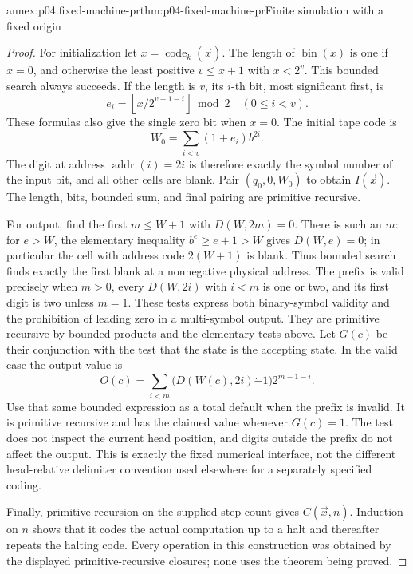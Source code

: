 \begin{annexitem}{annex:p04.fixed-machine-pr}{thm:p04-fixed-machine-pr}{Finite simulation with a fixed origin}
\begin{proof}
For initialization let \(x=\operatorname{code}_k(\vec x)\).
The length of \(\operatorname{bin}(x)\) is one if \(x=0\), and
otherwise the least positive \(v\leq x+1\) with \(x<2^v\).
This bounded search always succeeds. If the length is \(v\), its
\(i\)-th bit, most significant first, is
\[
 e_i=\left\lfloor x/2^{v-1-i}\right\rfloor\bmod2
       \quad(0\leq i<v).
\]
These formulas also give the single zero bit when \(x=0\).
The initial tape code is
\[
 W_0=\sum_{i<v}(1+e_i)b^{2i}.
\]
The digit at address \(\operatorname{addr}(i)=2i\) is therefore exactly
the symbol number of the input bit, and all other cells are blank.
Pair \((q_0,0,W_0)\) to obtain \(I(\vec x)\).
The length, bits, bounded sum, and final pairing are primitive recursive.

For output, find the first \(m\leq W+1\) with \(D(W,2m)=0\).
There is such an \(m\): for \(e>W\), the elementary inequality
\(b^e\geq e+1>W\) gives \(D(W,e)=0\); in particular the cell with
address code \(2(W+1)\) is blank. Thus bounded search finds exactly
the first blank at a nonnegative physical address. The prefix is valid
precisely when \(m>0\), every \(D(W,2i)\) with \(i<m\) is one or two,
and its first digit is two unless \(m=1\). These tests express both
binary-symbol validity and the prohibition of leading zero in a
multi-symbol output. They are primitive recursive by bounded products
and the elementary tests above. Let \(G(c)\) be their conjunction
with the test that the state is the accepting state. In the valid case
the output value is
\[
 O(c)=\sum_{i<m}
       \bigl(D(W(c),2i)\mathbin{\dot{-}}1\bigr)2^{m-1-i}.
\]
Use that same bounded expression as a total default when the prefix is
invalid. It is primitive recursive and has the claimed value whenever
\(G(c)=1\). The test does not inspect the current head position, and
digits outside the prefix do not affect the output. This is exactly the
fixed numerical interface, not the different head-relative delimiter
convention used elsewhere for a separately specified coding.

Finally, primitive recursion on the supplied step count gives
\(C(\vec x,n)\). Induction on \(n\) shows that it codes the actual
computation up to a halt and thereafter repeats the halting code.
Every operation in this construction was obtained by the displayed
primitive-recursive closures; none uses the theorem being proved.
\end{proof}
\end{annexitem}

